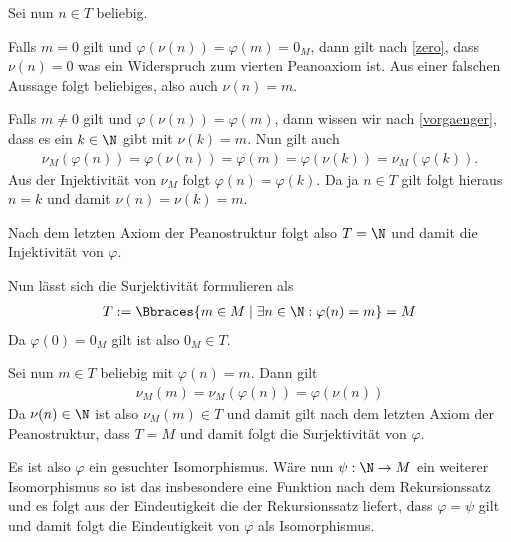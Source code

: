 \begin{solution}
    Sei nun $n \in T$ beliebig. 
    
    Falls $m = 0$ gilt und $\varphi(\nu(n)) = \varphi(m) = 0_M$, dann gilt nach \eqref{zero}, dass $\nu(n) = 0$ was ein Widerspruch zum vierten Peanoaxiom ist. Aus einer falschen Aussage folgt beliebiges, also auch $\nu(n) = m$. 

    Falls $m \neq 0$ gilt und $\varphi(\nu(n)) = \varphi(m)$, dann wissen wir nach \eqref{vorgaenger}, dass es ein $k \in \N$ gibt mit $\nu(k) = m$. Nun gilt auch
    \begin{align*}
        \nu_M(\varphi(n)) = \varphi(\nu(n)) = \varphi(m) = \varphi(\nu(k)) = \nu_M(\varphi(k)). 
    \end{align*} 
    Aus der Injektivität von $\nu_M$ folgt $\varphi(n) = \varphi(k)$. Da ja $n \in T$ gilt folgt hieraus $n = k$ und damit $\nu(n) = \nu(k) = m$. 

    Nach dem letzten Axiom der Peanostruktur folgt also $T = \N$ und damit die Injektivität von $\varphi$.

    Nun lässt sich die Surjektivität formulieren als
    \begin{align*}
        T := \Bbraces{m \in M \mid \exists n \in \N: \varphi(n) = m} = M
    \end{align*}
    Da $\varphi(0) = 0_M$ gilt ist also $0_M \in T$.

    Sei nun $m \in T$ beliebig mit $\varphi(n) = m$. Dann gilt
    \begin{align*}
        \nu_M(m) = \nu_M(\varphi(n)) = \varphi(\nu(n)) 
    \end{align*}
    Da $\nu(n) \in \N$ ist also $\nu_M(m) \in T$ und damit gilt nach dem letzten Axiom der Peanostruktur, dass $T = M$ und damit folgt die Surjektivität von $\varphi$.
    
    Es ist also $\varphi$ ein gesuchter Isomorphismus. Wäre nun $\psi: \N \to M$ ein weiterer Isomorphismus so ist das insbesondere eine Funktion nach dem Rekursionssatz und es folgt aus der Eindeutigkeit die der Rekursionssatz liefert, dass $\varphi = \psi$ gilt und damit folgt die Eindeutigkeit von $\varphi$ als Isomorphismus.
\end{solution}